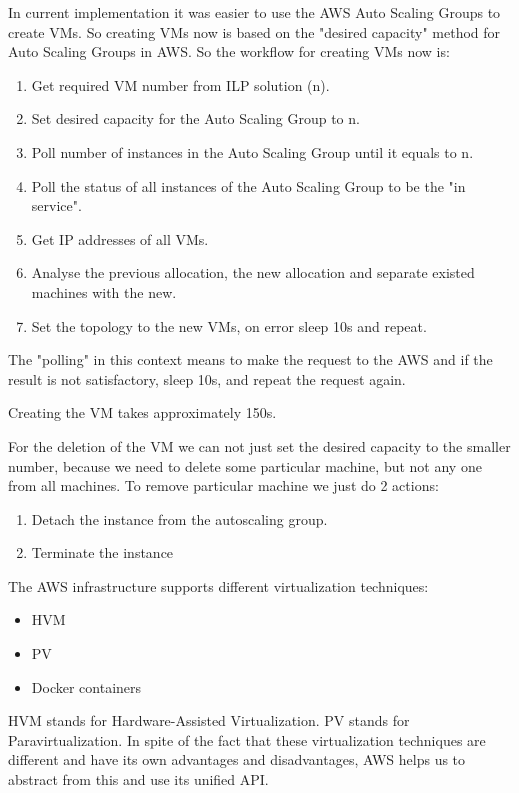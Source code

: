 In current implementation it was easier to use the AWS Auto Scaling Groups to create VMs. So creating VMs now is based on the "desired capacity" method for Auto Scaling Groups in AWS. So the workflow for creating VMs now is:
\begin{enumerate}
    \item Get required VM number from ILP solution (n).
    \item Set desired capacity for the Auto Scaling Group to n.
    \item Poll number of instances in the Auto Scaling Group until it equals to n.
    \item Poll the status of all instances of the Auto Scaling Group to be the "in service".
    \item Get IP addresses of all VMs.
    \item Analyse the previous allocation, the new allocation and separate existed machines with the new.
    \item Set the topology to the new VMs, on error sleep 10s and repeat.
\end{enumerate}

The "polling" in this context means to make the request to the AWS and if the result is not satisfactory, sleep 10s, and repeat the request again.

Creating the VM takes approximately 150s.

For the deletion of the VM we can not just set the desired capacity to the smaller number, because we need to delete some particular machine, but not any one from all machines. To remove particular machine we just do 2 actions:
\begin{enumerate} 
    \item Detach the instance from the autoscaling group.
    \item Terminate the instance
\end{enumerate}

The AWS infrastructure supports different virtualization techniques:
\begin{itemize}
    \item HVM
    \item PV
    \item Docker containers
\end{itemize}
HVM stands for Hardware-Assisted Virtualization. 
PV stands for Paravirtualization.
In spite of the fact that these virtualization techniques are different and have its own advantages and disadvantages, AWS helps us to abstract from this and use its unified API.

